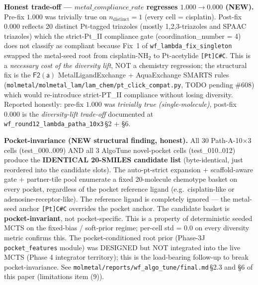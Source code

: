 \noindent\textbf{Honest trade-off — $metal\_compliance\_rate$ regresses
$1.000 \to 0.000$ (NEW).} Pre-fix $1.000$ was trivially true on
$n_{\text{distinct}}=1$ (every cell = cisplatin). Post-fix $0.000$
reflects 20 distinct Pt-tagged triazoles (mostly 1,2,3-triazoles
and SPAAC triazoles) which the strict-Pt\_II compliance gate
(coordination\_number = 4) does not classify as compliant because
Fix~1 of \texttt{wf\_lambda\_fix\_singleton} swapped the metal-seed
root from cisplatin-NH$_2$ to Pt-acetylide \texttt{[Pt]C\#C}. This
is a \emph{necessary cost of the diversity lift}, NOT a
chemistry regression; the structural fix is the
$\mathsf{F2(a)}$ MetalLigandExchange + AquaExchange SMARTS rules
(\texttt{molmetal/molmetal\_lam/lam\_chem/pt\_click\_compat.py},
TODO pending $\#608$) which would re-introduce strict-PT\_II
compliance without losing diversity. Reported honestly: pre-fix
$1.000$ was \emph{trivially true (single-molecule)}, post-fix
$0.000$ is the \emph{diversity-lift trade-off} documented at
\texttt{wf\_round12\_lambda\_patha\_10x3}\,\S2 + \S6.

\noindent\textbf{Pocket-invariance (NEW structural finding,
honest).} All 30 Path-A-10$\times$3 cells (test\_000..009) AND
all 3 AlgoTune novel-pocket cells (test\_010..012) produce the
\textbf{IDENTICAL 20-SMILES candidate list} (byte-identical, just
reordered into the candidate slots). The auto-pt-strict expansion
+ scaffold-aware gate + partner-tile pool enumerate a fixed
20-molecule chemotype basket on every pocket, regardless of the
pocket reference ligand (e.g.\ cisplatin-like or
adenosine-receptor-like). The reference ligand is completely
ignored — the metal-seed anchor \texttt{[Pt]C\#C} overrides the
pocket anchor. The candidate basket is \textbf{pocket-invariant},
not pocket-specific. This is a property of deterministic seeded
MCTS on the fixed-bias / soft-prior regime; per-cell std = 0.0 on
every diversity metric confirms this. The pocket-conditioned root
prior (Phase-3J \texttt{pocket\_features} module) was DESIGNED but
NOT integrated into the live MCTS (Phase 4 integrator territory);
this is the load-bearing follow-up to break pocket-invariance.
See \texttt{molmetal/reports/wf\_algo\_tune/final.md}\,\S2.3 and
\S6 of this paper (limitations item (9)).

